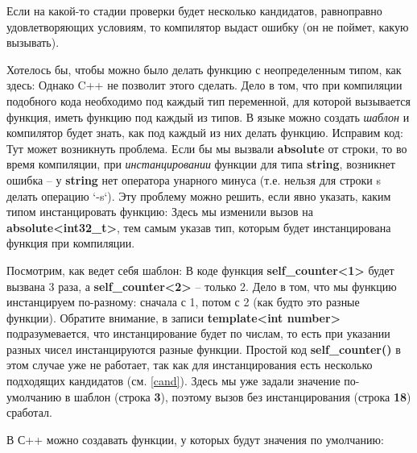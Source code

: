 \begin{lecture}[\lectureSubject]
\begin{lecSection}
		Если на какой-то стадии проверки будет несколько кандидатов, равноправно удовлетворяющих условиям, то компилятор выдаст ошибку (он не поймет, какую вызывать).
	\end{lecSection}
	\begin{lecSection}[Шаблоны]
		Хотелось бы, чтобы можно было делать функцию с неопределенным типом, как здесь: \newpage
		Однако C++ не позволит этого сделать. Дело в том, что при компиляции подобного кода необходимо под каждый тип переменной, для которой вызывается функция, иметь функцию под каждый из типов. В языке можно создать \textit{шаблон} и компилятор будет знать, как под каждый из них делать функцию. Исправим код:
		Тут может возникнуть проблема. Если бы мы вызвали \textbf{absolute} от строки, то во время компиляции, при \textit{инстанцировании} функции для типа \textbf{string}, возникнет ошибка -- у \textbf{string} нет оператора унарного минуса (т.е. нельзя для строки s делать операцию `-s`). Эту проблему можно решить, если явно указать, каким типом инстанцировать функцию:
		Здесь мы изменили вызов на \textbf{absolute<int32\_t>}, тем самым указав тип, которым будет инстанцирована функция при компиляции.
		
		Посмотрим, как ведет себя шаблон:
		В коде функция \textbf{self\_counter<1>} будет вызвана 3 раза, а \textbf{self\_counter<2>} -- только 2. Дело в том, что мы функцию инстанцируем по-разному: сначала с 1, потом с 2 (как будто это разные функции). Обратите внимание, в записи \textbf{template<int number>} подразумевается, что инстанцирование будет по числам, то есть при указании разных чисел инстанцируются разные функции. Простой код \textbf{self\_counter()} в этом случае уже не работает, так как для инстанцирования есть несколько подходящих кандидатов (см. \ref{cand}).
		Здесь мы уже задали значение по-умолчанию в шаблон (строка \textbf{3}), поэтому вызов без инстанцирования (строка \textbf{18}) сработал.
	\end{lecSection}
	\begin{lecSection}
		В С++ можно создавать функции, у которых будут значения по умолчанию:
		

\end{lecSection}
\end{lecture}
